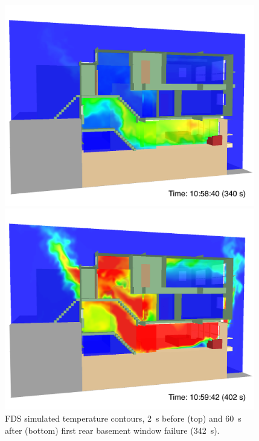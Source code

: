 \documentclass[12pt,oneside]{book}
\begin{document}
\begin{figure}[!ht]
\includegraphics[width=4.3in]{../Figures/SMV_Temp_340_s}


\includegraphics[width=4.3in]{../Figures/SMV_Temp_402_s}


\caption{FDS simulated temperature contours, 2~s before (top) and 60~s after (bottom) first rear basement window failure (342~s).}
\label{fig:smv_temperature}
\end{figure}


\clearpage
\end{document}
